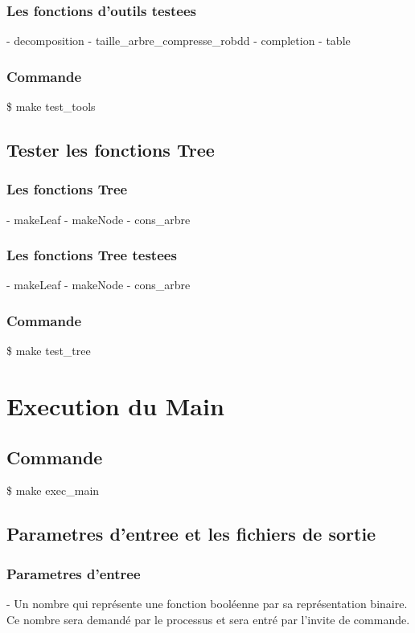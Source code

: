 \documentclass{article}
\begin{document}
\subsubsection{Les fonctions d'outils testees}
\tabto{1cm} - decomposition
\tabto{1cm} - taille\_arbre\_compresse\_robdd
\tabto{1cm} - completion
\tabto{1cm} - table

\subsubsection{Commande}
\tabto{1cm}\$ make test\_tools

\subsection{Tester les fonctions Tree}
\subsubsection{Les fonctions Tree}
\tabto{1cm} - makeLeaf
\tabto{1cm} - makeNode
\tabto{1cm} - cons\_arbre


\subsubsection{Les fonctions Tree testees}
\tabto{1cm} - makeLeaf
\tabto{1cm} - makeNode
\tabto{1cm} - cons\_arbre

\subsubsection{Commande}
\tabto{1cm}\$ make test\_tree

\section{Execution du Main}

\subsection{Commande}
\tabto{1cm}\$ make exec\_main

\subsection{Parametres d'entree et les fichiers de sortie}
\subsubsection{Parametres d'entree}
\tabto{1cm}- Un nombre qui représente une fonction booléenne par sa représentation binaire. Ce nombre sera demandé par le processus et sera entré par l'invite de commande.
\end{document}
